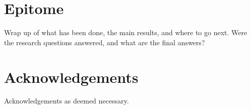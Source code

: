 \section{Epitome}
{\color{red}
Wrap up of what has been done, the main results, and where to go next. Were the research questions answered, and what
are the final answers?
}

\section{Acknowledgements}
{\color{red}
Acknowledgements as deemed necessary.
}